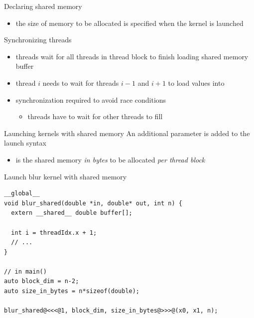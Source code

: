 \begin{frame}[fragile]{}
    \begin{info}{Declaring shared memory}
        \centering {}
        \begin{itemize}
            \item the size of memory to be allocated is specified when the kernel is launched
        \end{itemize}
    \end{info}

    \begin{info}{Synchronizing threads}
        \centering {}
        \begin{itemize}
            \item threads wait for all threads in thread block to finish loading shared memory buffer
            \item thread $i$ needs to wait for threads $i-1$ and $i+1$ to load values into 
            \item synchronization required to avoid race conditions
            \begin{itemize}
                \item threads have to wait for other threads to fill 
            \end{itemize}
        \end{itemize}
    \end{info}

\end{frame}

\begin{frame}[fragile]{}
    \begin{info}{Launching kernels with shared memory}
        An additional parameter is added to the launch syntax\\
        \centering {}
        \begin{itemize}
            \item {} is the shared memory \emph{in bytes} to be allocated \emph{per thread block}
        \end{itemize}
    \end{info}

    \begin{code}{Launch blur kernel with shared memory}
        \begin{lstlisting}[style=boxcudatiny]
__global__
void blur_shared(double *in, double* out, int n) {
  extern __shared__ double buffer[];

  int i = threadIdx.x + 1;
  // ...
}

// in main()
auto block_dim = n-2;
auto size_in_bytes = n*sizeof(double);

blur_shared@<<<@1, block_dim, size_in_bytes@>>>@(x0, x1, n);
        \end{lstlisting}
    \end{code}

\end{frame}

